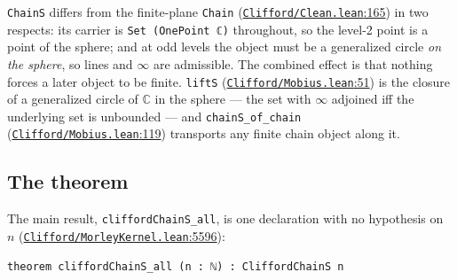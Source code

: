 \documentclass[11pt]{article}
\theoremstyle{definition}
\theoremstyle{remark}
\begin{document}
\texttt{ChainS} differs from the finite-plane \texttt{Chain} (\href{https://github.com/jpbald93/paperl_clifford_chain/blob/e1ae145c2565cc98816635387412edc0a740c27c/Clifford/Clean.lean\#L165}{\texttt{Clifford/\allowbreak Clean.lean}:165}) in two respects: its carrier is
\texttt{Set\ (OnePoint\ ℂ)} throughout, so the level-2 point is a point of the sphere; and at odd levels the object
must be a generalized circle \emph{on the sphere}, so lines and $\infty$ are admissible. The combined effect is that
nothing forces a later object to be finite. \texttt{liftS} (\href{https://github.com/jpbald93/paperl_clifford_chain/blob/e1ae145c2565cc98816635387412edc0a740c27c/Clifford/Mobius.lean\#L51}{\texttt{Clifford/\allowbreak Mobius.lean}:51}) is the closure of a
generalized circle of \(\mathbb{C}\) in the sphere --- the set with $\infty$ adjoined iff the underlying set is
unbounded --- and \texttt{chainS\_\allowbreak of\_\allowbreak chain} (\href{https://github.com/jpbald93/paperl_clifford_chain/blob/e1ae145c2565cc98816635387412edc0a740c27c/Clifford/Mobius.lean\#L119}{\texttt{Clifford/\allowbreak Mobius.lean}:119}) transports any finite chain object along
it.

\hypertarget{the-theorem}{%
\subsection{The theorem}\label{the-theorem}}

The main result, \texttt{cliffordChainS\_\allowbreak all}, is one declaration with no hypothesis on \(n\)
(\href{https://github.com/jpbald93/paperl_clifford_chain/blob/e1ae145c2565cc98816635387412edc0a740c27c/Clifford/MorleyKernel.lean\#L5596}{\texttt{Clifford/\allowbreak MorleyKernel.lean}:5596}):

\begin{Verbatim}
theorem cliffordChainS_all (n : ℕ) : CliffordChainS n
\end{Verbatim}
\end{document}
